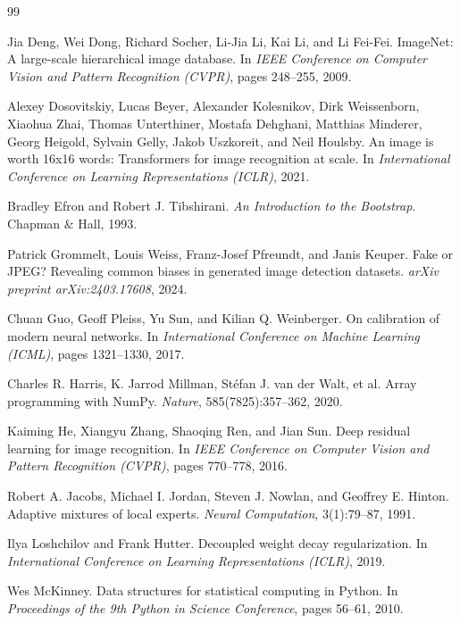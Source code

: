 \documentclass[10pt,a4paper]{article}
\begin{document}
\begin{thebibliography}{99}

Jia Deng, Wei Dong, Richard Socher, Li-Jia Li, Kai Li, and Li Fei-Fei.
ImageNet: A large-scale hierarchical image database.
In \emph{IEEE Conference on Computer Vision and Pattern Recognition (CVPR)}, pages 248--255, 2009.

Alexey Dosovitskiy, Lucas Beyer, Alexander Kolesnikov, Dirk Weissenborn, Xiaohua Zhai, Thomas Unterthiner, Mostafa Dehghani, Matthias Minderer, Georg Heigold, Sylvain Gelly, Jakob Uszkoreit, and Neil Houlsby.
An image is worth 16x16 words: Transformers for image recognition at scale.
In \emph{International Conference on Learning Representations (ICLR)}, 2021.

Bradley Efron and Robert J. Tibshirani.
\emph{An Introduction to the Bootstrap}.
Chapman \& Hall, 1993.

Patrick Grommelt, Louis Weiss, Franz-Josef Pfreundt, and Janis Keuper.
Fake or JPEG? Revealing common biases in generated image detection datasets.
\emph{arXiv preprint arXiv:2403.17608}, 2024.

Chuan Guo, Geoff Pleiss, Yu Sun, and Kilian Q. Weinberger.
On calibration of modern neural networks.
In \emph{International Conference on Machine Learning (ICML)}, pages 1321--1330, 2017.

Charles R. Harris, K. Jarrod Millman, St{\'e}fan J. van der Walt, et al.
Array programming with NumPy.
\emph{Nature}, 585(7825):357--362, 2020.

Kaiming He, Xiangyu Zhang, Shaoqing Ren, and Jian Sun.
Deep residual learning for image recognition.
In \emph{IEEE Conference on Computer Vision and Pattern Recognition (CVPR)}, pages 770--778, 2016.

Robert A. Jacobs, Michael I. Jordan, Steven J. Nowlan, and Geoffrey E. Hinton.
Adaptive mixtures of local experts.
\emph{Neural Computation}, 3(1):79--87, 1991.

Ilya Loshchilov and Frank Hutter.
Decoupled weight decay regularization.
In \emph{International Conference on Learning Representations (ICLR)}, 2019.

Wes McKinney.
Data structures for statistical computing in Python.
In \emph{Proceedings of the 9th Python in Science Conference}, pages 56--61, 2010.


\end{thebibliography}
\end{document}
